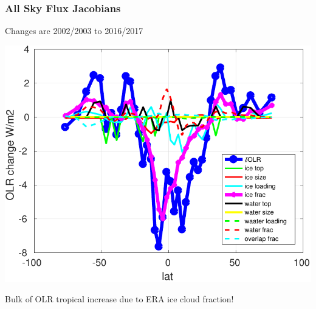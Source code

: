 \documentclass[10pt,t]{beamer}
\begin{document}
\begin{frame}
  \frametitle{All Sky Flux Jacobians}
  Changes are 2002/2003 to 2016/2017  \newline
  \begin{center}
    \noindent\includegraphics[width=0.675\linewidth]{Figs//allsky_cloud_fluxjacs.pdf}
  \end{center}
  Bulk of OLR tropical increase due to ERA ice cloud fraction!
\end{frame}
\end{document}
